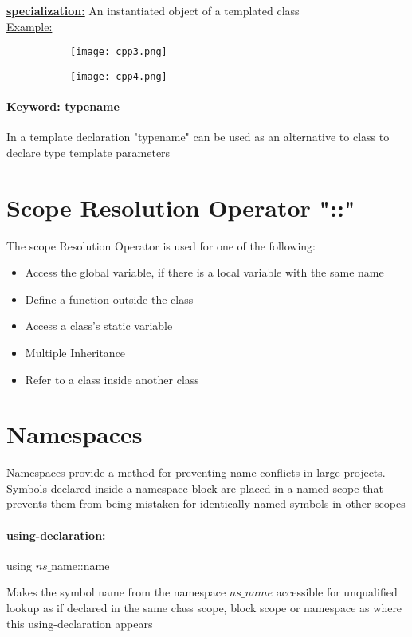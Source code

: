 \documentclass[8pt]{extreport}
\begin{document}
\underline{\textbf{specialization:}} An instantiated object of a templated class\\
\underline{Example:}
\begin{figure}[H]
\centering
\begin{subfigure}[b]{0.3\linewidth}
\texttt{[image: cpp3.png]}
\end{subfigure}
\begin{subfigure}[b]{0.5\linewidth}
\texttt{[image: cpp4.png]}
\end{subfigure}
\end{figure}

\paragraph{Keyword: typename} In a template declaration "typename" can be used as an alternative to class to declare type template parameters
\section{Scope Resolution Operator "::"}

The scope Resolution Operator is used for one of the following:

\begin{itemize}
\item Access the global variable, if there is a local variable with the same name
\item Define a function outside the class
\item Access a class's static variable
\item Multiple Inheritance
\item Refer to a class inside another class
\end{itemize}

\section{Namespaces}

Namespaces provide a method for preventing name conflicts in large projects. Symbols declared inside a namespace block are placed in a named scope that prevents them from being mistaken for identically-named symbols in other scopes

\paragraph{using-declaration:} 
\begin{center}
using $ns\_$name::name
\end{center}
Makes the symbol name from the namespace $ns\_name$ accessible for unqualified lookup as if declared in the same class scope, block scope or namespace as where this using-declaration appears
\end{document}
